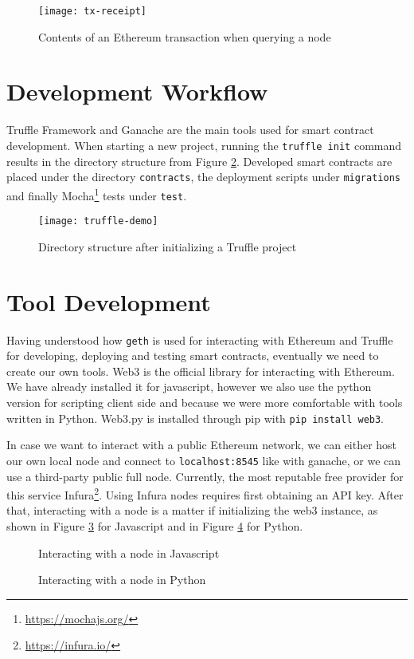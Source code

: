 \begin{figure}[htb]
    \centering
    \texttt{[image: tx-receipt]}
    \caption{Contents of an Ethereum transaction when querying a node}
    \label{fig:transaction}
\end{figure}

\section{Development Workflow}

Truffle Framework and Ganache are the main tools used for smart contract development. When starting a new project, running the \texttt{truffle init} command results in the directory structure from Figure \ref{fig:truffle}. Developed smart contracts are placed under the directory \texttt{contracts}, the deployment scripts under \texttt{migrations} and finally Mocha\footnote{\url{https://mochajs.org/}} tests under \texttt{test}.

\begin{figure}[htb]
    \centering
    \texttt{[image: truffle-demo]}
    \caption{Directory structure after initializing a Truffle project}
    \label{fig:truffle}
\end{figure}


\section{Tool Development}

Having understood how \texttt{geth} is used for interacting with Ethereum and Truffle for developing, deploying and testing smart contracts, eventually we need to create our own tools. Web3 is the official library for interacting with Ethereum. We have already installed it for javascript, however we also use the python version for scripting client side and because we were more comfortable with tools written in Python. Web3.py is installed through pip with \texttt{pip install web3}. 

In case we want to interact with a public Ethereum network, we can either host our own local node and connect to \texttt{localhost:8545} like with ganache, or we can use a third-party public full node. Currently, the most reputable free provider for this service Infura\footnote{\url{https://infura.io/}}. Using Infura nodes requires first obtaining an API key. After that, interacting with a node is a matter if initializing the web3 instance, as shown in Figure \ref{fig:web3js} for Javascript and in Figure \ref{fig:web3py} for Python.

\begin{figure}[htb]
    \centering
    
    \caption{Interacting with a node in Javascript}
    \label{fig:web3js}
\end{figure}

\begin{figure}[htb]
    \centering
    
    \caption{Interacting with a node in Python}
    \label{fig:web3py}
\end{figure}